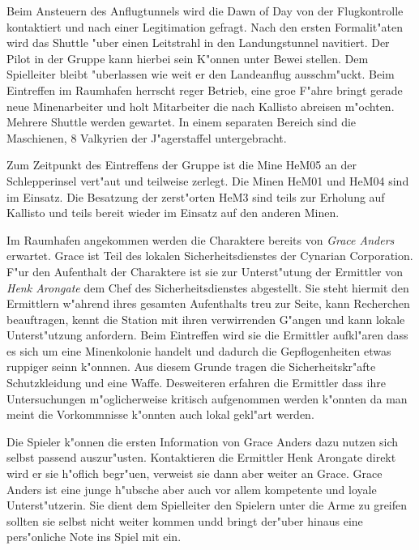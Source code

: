 Beim Ansteuern des Anflugtunnels wird die Dawn of Day von der Flugkontrolle kontaktiert und nach einer Legitimation gefragt. Nach den ersten Formalit"aten wird das Shuttle "uber einen Leitstrahl in den Landungstunnel navitiert. Der Pilot in der Gruppe kann hierbei sein K"onnen unter Bewei\3 stellen. Dem Spielleiter bleibt "uberlassen wie weit er den Landeanflug ausschm"uckt. Beim Eintreffen im Raumhafen herrscht reger Betrieb, eine gro\3e F"ahre bringt gerade neue Minenarbeiter und holt Mitarbeiter die nach Kallisto abreisen m"ochten. Mehrere Shuttle werden gewartet. In einem separaten Bereich sind die Maschienen, 8 Valkyrien der J"agerstaffel untergebracht. 

Zum Zeitpunkt des Eintreffens der Gruppe ist die Mine HeM05 an der Schlepperinsel vert"aut und teilweise zerlegt. Die Minen HeM01 und HeM04 sind im Einsatz. Die Besatzung der zerst"orten HeM3 sind teils zur Erholung auf Kallisto und teils bereit wieder im Einsatz auf den anderen Minen.

Im Raumhafen angekommen werden die Charaktere bereits von \emph{Grace Anders} erwartet. Grace ist Teil des lokalen Sicherheitsdienstes der Cynarian Corporation. F"ur den Aufenthalt der Charaktere ist sie zur Unterst"utung der Ermittler von \emph{Henk Arongate} dem Chef des Sicherheitsdienstes abgestellt. Sie steht hiermit den Ermittlern w"ahrend ihres gesamten Aufenthalts treu zur Seite, kann Recherchen beauftragen, kennt die Station mit ihren verwirrenden G"angen und kann lokale Unterst"utzung anfordern. Beim Eintreffen wird sie die Ermittler aufkl"aren dass es sich um eine Minenkolonie handelt und dadurch die Gepflogenheiten etwas ruppiger seinn k"onnnen. Aus diesem Grunde tragen die Sicherheitskr"afte Schutzkleidung und eine Waffe. Desweiteren erfahren die Ermittler dass ihre Untersuchungen m"oglicherweise kritisch aufgenommen werden k"onnten da man meint die Vorkommnisse k"onnten auch lokal gekl"art werden.

\begin{remarks}
	Die Spieler k"onnen die ersten Information von Grace Anders dazu nutzen sich selbst passend auszur"usten. Kontaktieren die Ermittler Henk Arongate direkt wird er sie h"oflich begr"u\3en, verweist sie dann aber weiter an Grace. Grace Anders ist eine junge h"ubsche aber auch vor allem kompetente und loyale Unterst"utzerin. Sie dient dem Spielleiter den Spielern unter die Arme zu greifen sollten sie selbst nicht weiter kommen undd bringt der"uber hinaus eine pers"onliche Note ins Spiel mit ein.
\end{remarks}

